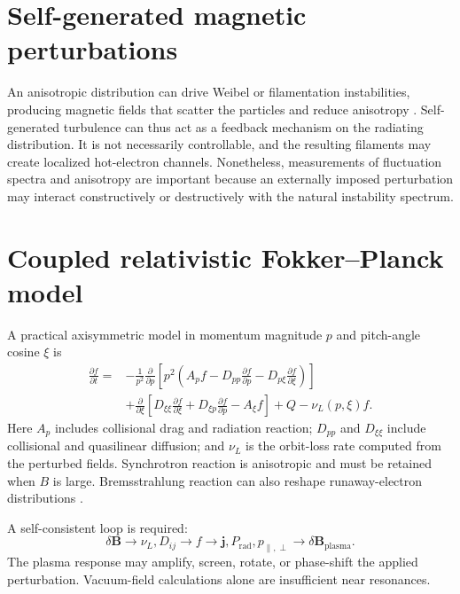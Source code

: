 \section{Self-generated magnetic perturbations}

An anisotropic distribution can drive Weibel or filamentation instabilities, producing magnetic fields that scatter the particles and reduce anisotropy \cite{weibel1959}. Self-generated turbulence can thus act as a feedback mechanism on the radiating distribution. It is not necessarily controllable, and the resulting filaments may create localized hot-electron channels. Nonetheless, measurements of fluctuation spectra and anisotropy are important because an externally imposed perturbation may interact constructively or destructively with the natural instability spectrum.

\section{Coupled relativistic Fokker--Planck model}

A practical axisymmetric model in momentum magnitude $p$ and pitch-angle cosine $\xi$ is
\begin{align}
\frac{\partial f}{\partial t}
={}&-\frac{1}{p^2}\frac{\partial}{\partial p}
\left[p^2\left(A_p f-D_{pp}\frac{\partial f}{\partial p}
-D_{p\xi}\frac{\partial f}{\partial\xi}\right)\right] \\
&+\frac{\partial}{\partial\xi}
\left[D_{\xi\xi}\frac{\partial f}{\partial\xi}
+D_{\xi p}\frac{\partial f}{\partial p}
-A_\xi f\right]
+Q-\nu_L(p,\xi)f.
\label{eq:fp-final}
\end{align}
Here $A_p$ includes collisional drag and radiation reaction; $D_{pp}$ and $D_{\xi\xi}$ include collisional and quasilinear diffusion; and $\nu_L$ is the orbit-loss rate computed from the perturbed fields. Synchrotron reaction is anisotropic and must be retained when $B$ is large. Bremsstrahlung reaction can also reshape runaway-electron distributions \cite{embreus2016}.

A self-consistent loop is required:
\begin{equation}
\delta\mathbf{B}
\rightarrow \nu_L,D_{ij}
\rightarrow f
\rightarrow \mathbf{j},P_{\mathrm{rad}},p_{\parallel,\perp}
\rightarrow \delta\mathbf{B}_{\mathrm{plasma}}.
\end{equation}
The plasma response may amplify, screen, rotate, or phase-shift the applied perturbation. Vacuum-field calculations alone are insufficient near resonances.

